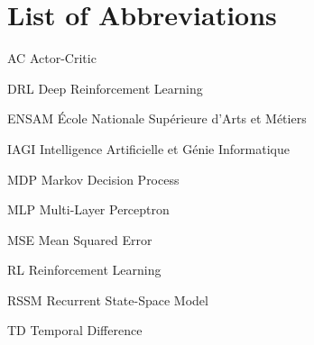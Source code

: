 \chapter*{List of Abbreviations}

\begin{abbrv}
    \item[AC]       Actor-Critic
    \item[DRL]      Deep Reinforcement Learning
    \item[ENSAM]    \'Ecole Nationale Sup\'erieure d'Arts et M\'etiers
    \item[IAGI]     Intelligence Artificielle et G\'enie Informatique
    \item[MDP]      Markov Decision Process
    \item[MLP]      Multi-Layer Perceptron
    \item[MSE]      Mean Squared Error
    \item[RL]       Reinforcement Learning
    \item[RSSM]     Recurrent State-Space Model
    \item[TD]       Temporal Difference
\end{abbrv}
